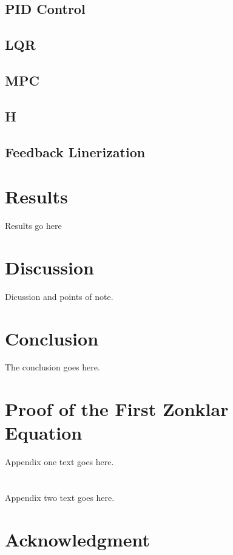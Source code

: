 \documentclass[journal]{IEEEtran}
\begin{document}
 \subsection{PID Control}

 \subsection{LQR}

 \subsection{MPC}

 \subsection{H \infity}

 \subsection{Feedback Linerization}

 \section{Results}

Results go here

\section{Discussion}

Dicussion and points of note.


\section{Conclusion}
The conclusion goes here.


\appendices
\section{Proof of the First Zonklar Equation}
Appendix one text goes here.


\section{}
Appendix two text goes here.


\section*{Acknowledgment}
\end{document}
